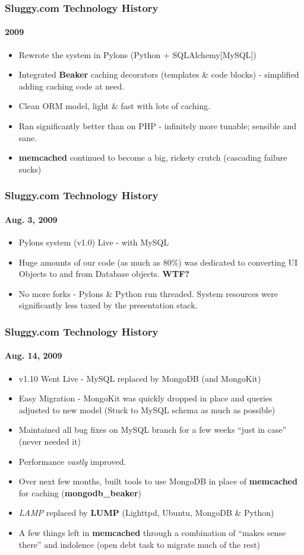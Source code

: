 \documentclass{beamer}
\begin{document}
\begin{frame}
\frametitle{Sluggy.com Technology History}
\framesubtitle{2009}
	\begin{itemize}
		\item Rewrote the system in Pylons (Python + SQLAlchemy[MySQL])
		\item Integrated {\bf Beaker} caching decorators (templates \& code blocks) - simplified adding caching code at need.
		\item Clean ORM model, light \& fast with lots of caching.
		\item Ran significantly better than on PHP - infinitely more tunable; sensible and sane.
		\item {\bf memcached} continued to become a big, rickety crutch (cascading failure sucks)
	\end{itemize}
\end{frame}
\begin{frame}
\frametitle{Sluggy.com Technology History}
\framesubtitle{Aug. 3, 2009}
	\begin{itemize}
		\item Pylons system (v1.0) Live - with MySQL
		\item Huge amounts of our code (as much as 80\%) was dedicated to converting UI Objects to and from Database objects. {\bf WTF?}
		\item No more forks - Pylons \& Python run threaded. System resources were significantly less taxed by the presentation stack.
	\end{itemize}
\end{frame}
\begin{frame}
\frametitle{Sluggy.com Technology History}
\framesubtitle{Aug. 14, 2009}
	\begin{itemize}
		\item v1.10 Went Live - MySQL replaced by MongoDB (and MongoKit)
		\item Easy Migration - MongoKit was quickly dropped in place and queries adjusted to new model (Stuck to MySQL schema as much as possible)
		\item Maintained all bug fixes on MySQL branch for a few weeks ``just in case'' (never needed it)
		\item Performance {\em vastly} improved.
		\item Over next few months, built tools to use MongoDB in place of {\bf memcached} for caching ({\bf mongodb\_beaker})
		\item {\em LAMP} replaced by {\bf LUMP} (Lighttpd, Ubuntu, MongoDB \& Python)
		\item A few things left in {\bf memcached} through a combination of ``makes sense there'' and indolence (open debt task to migrate much of the rest)
	\end{itemize}
\end{frame}
\end{document}
